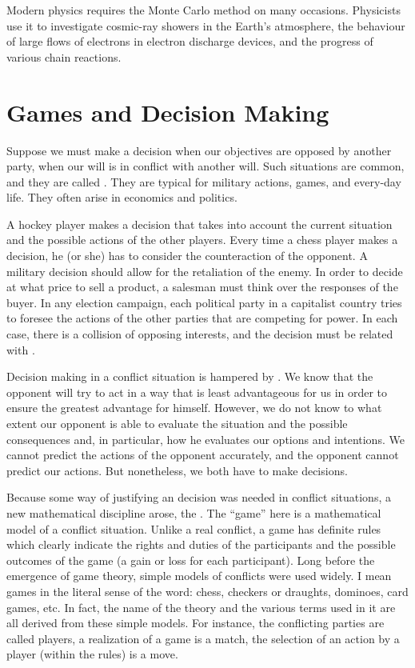 Modern physics requires the Monte Carlo method on many
occasions. Physicists use it to investigate cosmic-ray showers in the
Earth's atmosphere, the behaviour of large flows of electrons in electron
discharge devices, and the progress of various chain reactions.

\section{Games and Decision Making}

 Suppose we must make a decision when
our objectives are opposed by another party, when our will is in conflict
with another will. Such situations are common, and they are called
. They are typical for military actions, games, and
every-day life. They often arise in economics and politics.

A hockey player makes a decision that takes into account the current
situation and the possible actions of the other players. Every time
a chess player makes a decision, he (or she) has to consider the
counteraction of the opponent. A military decision should allow for the
retaliation of the enemy. In order to decide at what price to sell
a product, a salesman must think over the responses of the buyer. In
any election campaign, each political party in a capitalist country tries
to foresee the actions of the other parties that are competing for power.
In each case, there is a collision of opposing interests, and the decision
must be related with .

Decision making in a conflict situation is hampered by . We know that the opponent will try
to act in a way that is least advantageous for us in order to ensure the
greatest advantage for himself. However, we do not know to what extent
our opponent is able to evaluate the situation and the possible
consequences and, in particular, how he evaluates our options and
intentions. We cannot predict the actions of the opponent accurately,
and the opponent cannot predict our actions. But nonetheless, we both
have to make decisions.

Because some way of justifying an  decision was needed in
conflict situations, a new mathematical discipline arose, the . The ``game'' here is a mathematical model of a conflict situation.
Unlike a real conflict, a game has definite rules which clearly indicate
the rights and duties of the participants and the possible outcomes of
the game (a gain or loss for each participant). Long before the
emergence of game theory, simple models of conflicts were used widely.
I mean games in the literal sense of the word: chess, checkers or
draughts, dominoes, card games, etc. In fact, the name of the theory and
the various terms used in it are all derived from these simple models.
For instance, the conflicting parties are called players, a realization of
a game is a match, the selection of an action by a player (within the
rules) is a move.

